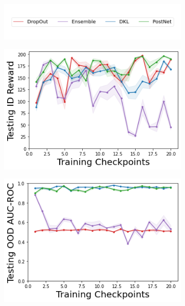 \begin{figure}
    \centering
    \vspace{-7mm}
        \begin{subfigure}{.5\textwidth}
        \includegraphics[width=\textwidth]{sections/011_icml2022/resources/legend.png}
    \end{subfigure}
    \vspace{-5mm}
    
    \begin{subfigure}{.4\textwidth}
        \includegraphics[width=\textwidth]{sections/011_icml2022/resources/CartPole-v0-mean_reward_-testing-model.png}  
    \end{subfigure}
    \begin{subfigure}{.4\textwidth}
        \includegraphics[width=\textwidth]{sections/011_icml2022/resources/CartPoleOOD-v0-AUC-ROC-epistemic_-testing-model.png}

\end{subfigure}
\end{figure}
